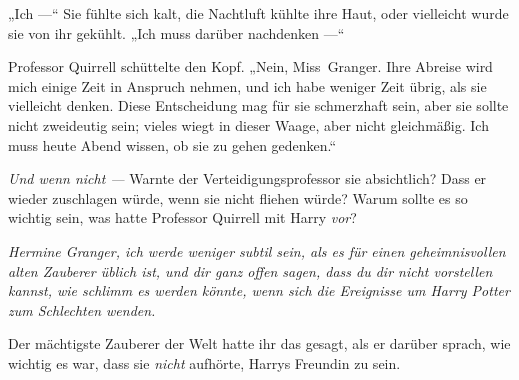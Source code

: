 „Ich —“ Sie fühlte sich kalt, die Nachtluft kühlte ihre Haut, oder vielleicht wurde sie von ihr gekühlt.
„Ich muss darüber nachdenken —“

Professor Quirrell schüttelte den Kopf.
„Nein, Miss~Granger. Ihre Abreise wird mich einige Zeit in Anspruch nehmen, und ich habe weniger Zeit übrig, als sie vielleicht denken. Diese Entscheidung mag für sie schmerzhaft sein, aber sie sollte nicht zweideutig sein; vieles wiegt in dieser Waage, aber nicht gleichmäßig. Ich muss heute Abend wissen, ob sie zu gehen gedenken.“

%
\emph{Und wenn nicht —}
Warnte der Verteidigungsprofessor sie absichtlich? Dass er wieder zuschlagen würde, wenn sie nicht fliehen würde?
%
Warum sollte es so wichtig sein, was hatte Professor Quirrell mit Harry \emph{vor}?

\emph{Hermine Granger, ich werde weniger subtil sein, als es für einen geheimnisvollen alten Zauberer üblich ist, und dir ganz offen sagen, dass du dir nicht \emph{vorstellen} kannst, wie schlimm es werden könnte, wenn sich die Ereignisse um Harry Potter zum Schlechten wenden.}

Der mächtigste Zauberer der Welt hatte ihr das gesagt, als er darüber sprach, wie wichtig es war, dass sie \emph{nicht} aufhörte, Harrys Freundin zu sein.

